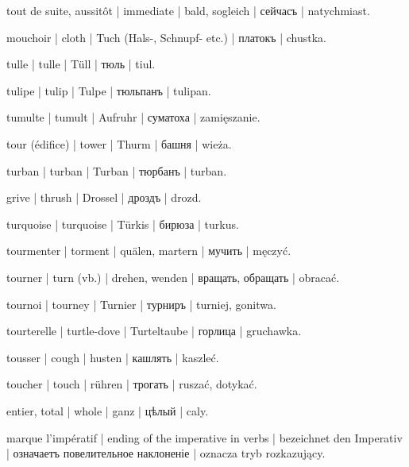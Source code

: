 \begin{outdent}{1em}
tout de suite, aussitôt | immediate | bald, sogleich | сейчасъ | natychmiast.

mouchoir | cloth | Tuch (Hals-, Schnupf- etc.) | платокъ | chustka.

tulle | tulle | Tüll | тюль | tiul.

tulipe | tulip | Tulpe | тюльпанъ | tulipan.

tumulte | tumult | Aufruhr | суматоха | zamięszanie.

tour (édifice) | tower | Thurm | башня | wieża.

turban | turban | Turban | тюрбанъ | turban.

grive | thrush | Drossel | дроздъ | drozd.

turquoise | turquoise | Türkis | бирюза | turkus.

tourmenter | torment | quälen, martern | мучить | męczyć.

tourner | turn (vb.) | drehen, wenden | вращать, обращать | obracać.

tournoi | tourney | Turnier | турниръ | turniej, gonitwa.

tourterelle | turtle-dove | Turteltaube | горлица | gruchawka.

tousser | cough | husten | кашлять | kaszleć.

toucher | touch | rühren | трогать | ruszać, dotykać.

entier, total | whole | ganz | цѣлый | caly.


marque l’impératif | ending of the imperative in verbs | bezeichnet
den Imperativ | означаетъ повелительное наклоненіе | oznacza tryb
rozkazujący.


\end{outdent}
